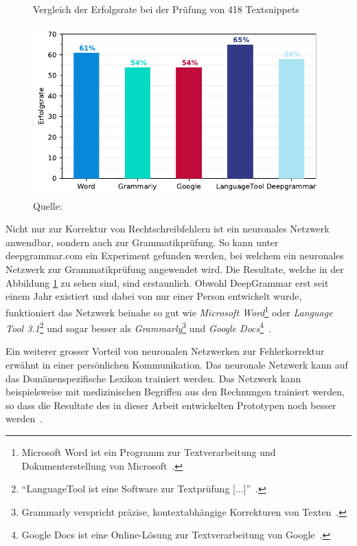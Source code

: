 \begin{figure}[h!] %
    \centering
    \captionsetup{width=.9\linewidth}
    \caption{Vergleich der Erfolgsrate bei der Prüfung von 418 Textsnippets}
    \label{deepgrammar}
    \includegraphics{graphics/matplot/grammar-tools.pdf}
    \caption*{Quelle: \textcite{Mugan}}
\end{figure} %
Nicht nur zur Korrektur von Rechtschreibfehlern ist ein neuronales Netzwerk anwendbar, sondern auch zur Grammatikprüfung. So kann unter deepgrammar.com ein Experiment gefunden werden, bei welchem ein neuronales Netzwerk zur Grammatikprüfung angewendet wird. Die Resultate, welche in der Abbildung \ref{deepgrammar} zu sehen sind, sind erstaunlich. Obwohl DeepGrammar erst seit einem Jahr existiert und dabei von nur einer Person entwickelt wurde, funktioniert das Netzwerk beinahe so gut wie \textit{Microsoft Word}\footnote{Microsoft Word ist ein Programm zur Textverarbeitung und Dokumenterstellung von Microsoft~\autocite{MicrosoftCorporation2018}.} oder \textit{Language Tool 3.1}\footnote{\enquote{LanguageTool ist eine Software zur Textprüfung [...]}~\autocite{LanguageTool2018}.} und sogar besser als \textit{Grammarly}\footnote{Grammarly verspricht präzise, kontextabhängige Korrekturen von Texten~\autocite{GrammarlyInc.2018}.} und \textit{Google Docs}\footnote{Google Docs ist eine Online-Lösung zur Textverarbeitung von Google~\autocite{GoogleLLC2018}.}~\autocite{Mugan}.


Ein weiterer grosser Vorteil von neuronalen Netzwerken zur Fehlerkorrektur erwähnt \textcite{Mugan2018} in einer persönlichen Kommunikation. Das neuronale Netzwerk kann auf das Domänenspezifische Lexikon trainiert werden. Das Netzwerk kann beispielsweise mit medizinischen Begriffen aus den Rechnungen trainiert werden, so dass die Resultate des in dieser Arbeit entwickelten Prototypen noch besser werden~\autocite{Mugan2018}.

